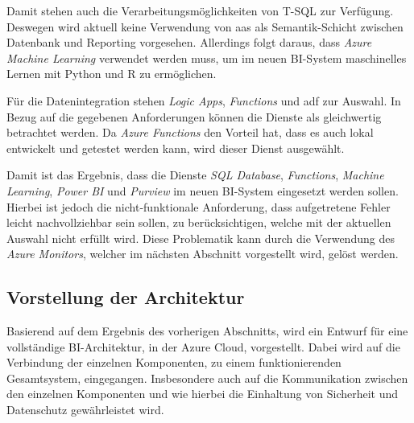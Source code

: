 Damit stehen auch die Verarbeitungsmöglichkeiten von T-SQL zur Verfügung. Deswegen wird aktuell keine Verwendung von \ac{aas} als Semantik-Schicht zwischen Datenbank und Reporting vorgesehen. Allerdings folgt daraus, dass \textit{Azure Machine Learning} verwendet werden muss, um im neuen BI-System maschinelles Lernen mit Python und R zu ermöglichen.

Für die Datenintegration stehen \textit{Logic Apps}, \textit{Functions} und \ac{adf} zur Auswahl. In Bezug auf die gegebenen Anforderungen können die Dienste als gleichwertig betrachtet werden. Da \textit{Azure Functions} den Vorteil hat, dass es auch lokal entwickelt und getestet werden kann, wird dieser Dienst ausgewählt.

Damit ist das Ergebnis, dass die Dienste \textit{SQL Database}, \textit{Functions}, \textit{Machine Learning}, \textit{Power BI} und \textit{Purview} im neuen BI-System eingesetzt werden sollen. Hierbei ist jedoch die nicht-funktionale Anforderung, dass aufgetretene Fehler leicht nachvollziehbar sein sollen, zu berücksichtigen, welche mit der aktuellen Auswahl nicht erfüllt wird. Diese Problematik kann durch die Verwendung des \textit{Azure Monitors}, welcher im nächsten Abschnitt vorgestellt wird, gelöst werden.



\subsection{Vorstellung der Architektur}
Basierend auf dem Ergebnis des vorherigen Abschnitts, wird ein Entwurf für eine vollständige BI-Architektur, in der Azure Cloud, vorgestellt. Dabei wird auf die Verbindung der einzelnen Komponenten, zu einem funktionierenden Gesamtsystem, eingegangen. Insbesondere auch auf die Kommunikation zwischen den einzelnen Komponenten und wie hierbei die Einhaltung von Sicherheit und Datenschutz gewährleistet wird.

